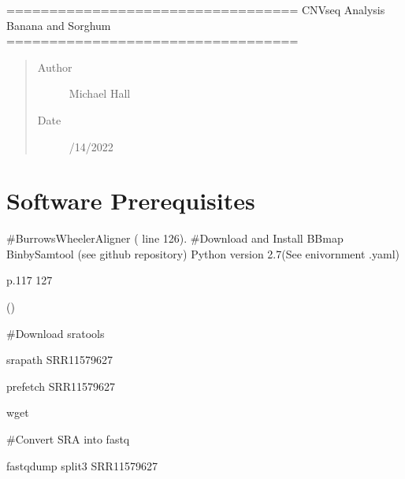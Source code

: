 \documentclass[letterpaper,10pt,english]{sphinxhowto}
\begin{document}
\pagestyle{plain}
\sphinxtableofcontents
\pagestyle{normal}
\label{\detokenize{index::doc}}


\sphinxAtStartPar
==================================
CNVseq Analysis Banana and Sorghum
==================================
\begin{quote}\begin{description}
\item[{Author}] \leavevmode
\sphinxAtStartPar
Michael Hall

\item[{Date}] \leavevmode
{}/14/2022

\end{description}\end{quote}


\section{Software Prerequisites}
\label{\detokenize{CNV:software-prerequisites}}\label{\detokenize{CNV::doc}}
\sphinxAtStartPar
\#Burrows\sphinxhyphen{}Wheeler\sphinxhyphen{}Aligner
( line 126).
\#Download and Install BBmap
Bin\sphinxhyphen{}by\sphinxhyphen{}Sam\sphinxhyphen{}tool (see github repository)
Python version 2.7(See enivornment .yaml)

\sphinxAtStartPar
{}

\sphinxAtStartPar
{}
p.117 \sphinxhyphen{} 127

\sphinxAtStartPar
()

\sphinxAtStartPar
\#Download sratools

\sphinxAtStartPar
srapath SRR11579627

\sphinxAtStartPar
prefetch SRR11579627

\sphinxAtStartPar
wget 

\sphinxAtStartPar
\#Convert SRA into fastq

\sphinxAtStartPar
fastq\sphinxhyphen{}dump \textendash{}split\sphinxhyphen{}3 SRR11579627
\end{document}
